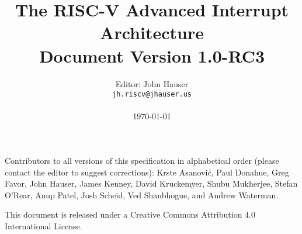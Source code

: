 \documentclass[twoside,11pt]{book}
\newcommand{\AIARev}{1.0-RC3}
\begin{document}

\title{%
  \vspace{-0.7in}%
  {\Large\bf The RISC-V Advanced Interrupt Architecture} \\
  {\large Document Version \AIARev}
  \vspace{-0.1in}%
}

\author{%
  Editor: John Hauser \\
  {\tt jh.riscv\mbox{}@jhauser.us} \\
  \\
  \today
}

\date{}
\maketitle

\thispagestyle{empty}

Contributors to all versions of this specification in alphabetical
order (please contact the editor to suggest corrections):
Krste Asanovi\'{c},
Paul Donahue,
Greg Favor,
John Hauser,
James Kenney,
David Kruckemyer,
Shubu Mukherjee,
Stefan O'Rear,
Anup Patel,
Josh Scheid,
Ved Shanbhogue,
and Andrew Waterman.

This document is released under a Creative Commons Attribution 4.0
International License.


\frontmatter



{\hypersetup{linktoc=all,hidelinks}
\tableofcontents
}


\mainmatter











\end{document}
